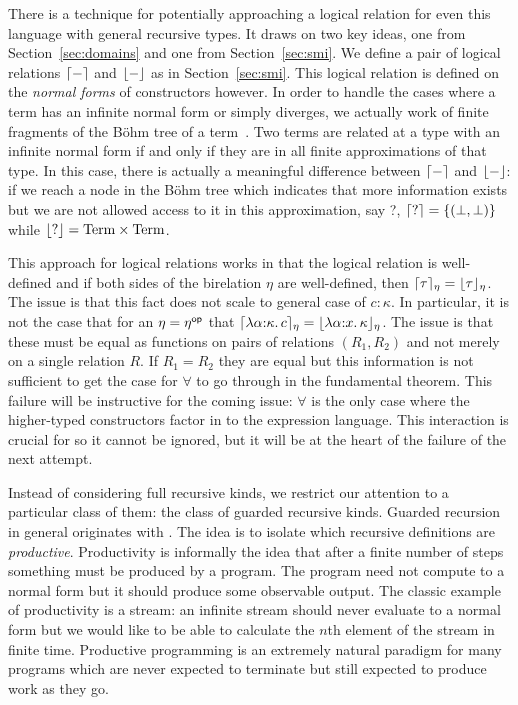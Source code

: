 There is a technique for potentially approaching a logical relation
for even this language with general recursive types. It draws on two
key ideas, one from Section~\ref{sec:domains} and one from
Section~\ref{sec:smi}. We define a pair of logical relations
$\lceil - \rceil$ and $\lfloor - \rfloor$ as in Section~\ref{sec:smi}. This
logical relation is defined on the \emph{normal forms} of
constructors however. In order to handle the cases where a term has an
infinite normal form or simply diverges, we actually work of finite
fragments of the B\"ohm tree of a term~\citep{TODO-BOHM}. Two terms
are related at a type with an infinite normal form if and only if they
are in all finite approximations of that type. In this case, there is
actually a meaningful difference between $\lceil - \rceil$ and
$\lfloor - \rfloor$: if we reach a node in the B\"ohm tree which indicates
that more information exists but we are not allowed access to it in
this approximation, say ?, $\lceil ? \rceil = \{(\bot, \bot)\}$ while
$\lfloor ? \rfloor = \mathrm{Term} \times \mathrm{Term}$.

This approach for logical relations works in that the logical relation
is well-defined and if both sides of the birelation $\eta$ are
well-defined, then $\lceil \tau \rceil_\eta =
\lfloor \tau \rfloor_\eta$. The issue is that this fact does not scale to
general case of $c : \kappa$. In particular, it is not the case that
for an $\eta = \eta^{\mathsf{op}}$ that
$\lceil \lambda \alpha {:} \kappa.\, c \rceil_\eta = \lfloor \lambda \alpha {:} x.\, \kappa \rfloor_\eta$.
The issue is that these must be equal as functions on pairs of
relations $(R_1, R_2)$ and not merely on a single relation $R$. If
$R_1 = R_2$ they are equal but this information is not sufficient to
get the case for $\forall$ to go through in the fundamental
theorem. This failure will be instructive for the coming issue:
$\forall$ is the only case where the higher-typed constructors factor
in to the expression language. This interaction is crucial for
\citet{TODO-POTTIER} so it cannot be ignored, but it will be at the
heart of the failure of the next attempt.

Instead of considering full recursive kinds, we restrict our attention
to a particular class of them: the class of guarded recursive
kinds. Guarded recursion in general originates with
\citet{TODO-NAKANO}. The idea is to isolate which recursive
definitions are \emph{productive}. Productivity is informally the idea
that after a finite number of steps something must be produced by a
program. The program need not compute to a normal form but it should
produce some observable output. The classic example of productivity is
a stream: an infinite stream should never evaluate to a normal form
but we would like to be able to calculate the $n$th element of the
stream in finite time. Productive programming is an extremely natural
paradigm for many programs which are never expected to terminate but
still expected to produce work as they go.

